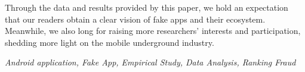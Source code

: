 Through the data and results provided by this paper, we hold an expectation that our readers obtain a clear vision of fake apps and their ecosystem.
Meanwhile, we also long for raising more researchers' interests and participation, shedding more light on the mobile underground industry.

{} \textit{Android application, Fake App, Empirical Study, Data Analysis, Ranking Fraud}

